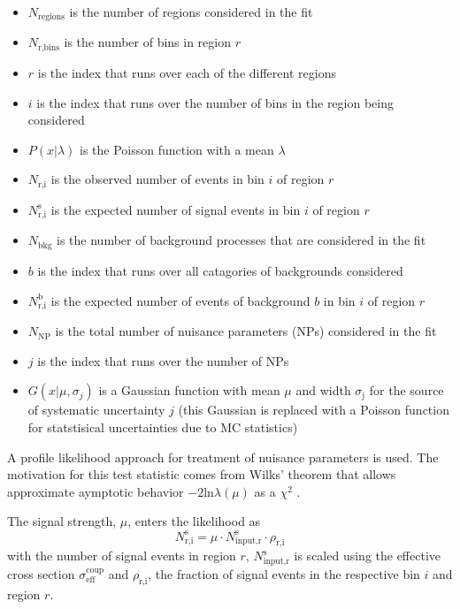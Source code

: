 \begin{itemize}
\item $N_{\text{regions}}$ is the number of regions considered in the fit
\item $N_\text{r,bins}$ is the number of bins in region $r$
\item $r$ is the index that runs over each of the different regions
\item $i$ is the index that runs over the number of bins in the region being considered
\item $P(x|\lambda)$ is the Poisson function with a mean $\lambda$
\item $N_\text{r,i}$ is the observed number of events in bin $i$ of region $r$
\item $N_\text{r,i}^\text{s}$ is the expected number of signal events in bin $i$ of region $r$
\item $N_\text{bkg}$ is the number of background processes that are considered in the fit
\item $b$ is the index that runs over all catagories of backgrounds considered
\item $N_\text{r,i}^\text{b}$ is the expected number of events of background $b$ in bin $i$ of region $r$
\item $N_\text{NP}$ is the total number of nuisance parameters (NPs) considered in the fit
\item $j$ is the index that runs over the number of NPs
\item $G(x|\mu,\sigma_{j})$ is a Gaussian function with mean $\mu$ and width $\sigma_\text{j}$ for the source of systematic uncertainty $j$ (this Gaussian is replaced with a Poisson function for statstisical uncertainties due to MC statistics)
\end{itemize}

A profile likelihood approach for treatment of nuisance parameters \cite{Cowan:2010js} is used. The motivation for this test statistic comes from Wilks' theorem that allows approximate aymptotic behavior $-2 \text{ln} \lambda(\mu)$ as a $\chi^2$ \cite{Wilks:1938dza}.

The signal strength, $\mu$, enters the likelihood as
\[ N_\text{r,i}^\text{s} = \mu \cdot N_\text{input,r}^\text{s} \cdot \rho_\text{r,i}
\]
with the number of signal events in region $r$, $N_\text{input,r}^\text{s}$ is scaled using the effective cross section $\sigma_\text{eff}^\text{coup}$ and $\rho_\text{r,i}$, the fraction of signal events in the respective bin $i$ and region $r$. 

